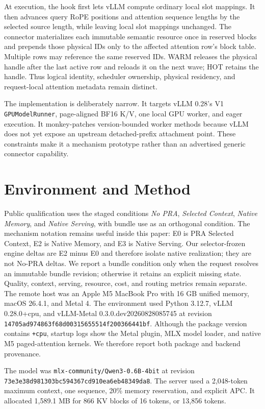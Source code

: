 \documentclass[10pt]{article}
\begin{document}
At execution, the hook first lets vLLM compute ordinary local slot mappings.
It then advances query RoPE positions and attention sequence lengths by the
selected source length, while leaving local slot mappings unchanged. The
connector materializes each immutable semantic resource once in reserved
blocks and prepends those physical IDs only to the affected attention row's
block table. Multiple rows may reference the same reserved IDs. WARM releases
the physical handle after the last active row and reloads it on the next wave;
HOT retains the handle. Thus logical identity, scheduler ownership, physical
residency, and request-local attention metadata remain distinct.

The implementation is deliberately narrow. It targets vLLM 0.28's V1
\texttt{GPUModelRunner}, page-aligned BF16 K/V, one local GPU worker, and eager
execution. It monkey-patches version-bounded worker methods because vLLM does
not yet expose an upstream detached-prefix attachment point. These constraints
make it a mechanism prototype rather than an advertised generic connector
capability.

\section{Environment and Method}

Public qualification uses the staged conditions \emph{No PRA}, \emph{Selected
Context}, \emph{Native Memory}, and \emph{Native Serving}, with bundle use as
an orthogonal condition.  The mechanism notation remains useful inside this
paper: E0 is PRA Selected Context, E2 is Native Memory, and E3 is Native
Serving.  Our selector-frozen engine deltas are E2 minus E0 and therefore
isolate native realization; they are not No-PRA deltas.  We report a bundle
condition only when the request resolves an immutable bundle revision;
otherwise it retains an explicit missing state. Quality, context, serving,
resource, cost, and routing metrics remain separate.
The remote host was an Apple M5 MacBook Pro with 16 GB unified memory, macOS
26.4.1, and Metal 4. The environment used Python 3.12.7, vLLM
0.28.0+cpu, and vLLM-Metal
0.3.0.dev20260828085745 at revision
\texttt{14705ad974863f68d00315655514f200366441bf}. Although the package version
contains \texttt{+cpu}, startup logs show the Metal plugin, MLX model loader,
and native M5 paged-attention kernels. We therefore report both package and
backend provenance.

The model was \texttt{mlx-community/Qwen3-0.6B-4bit} at revision
\texttt{73e3e38d981303bc594367cd910ea6eb48349da8}. The server used a 2,048-token
maximum context, one sequence, 20\% memory reservation, and explicit APC. It
allocated 1,589.1 MB for 866 KV blocks of 16 tokens, or 13,856 tokens.
\end{document}
